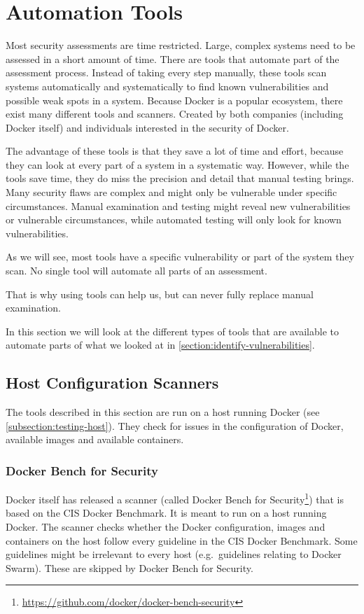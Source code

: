 \section{Automation Tools}\label{section:tools}
Most security assessments are time restricted. Large, complex systems need to be assessed in a short amount of time. There are tools that automate part of the assessment process. Instead of taking every step manually, these tools scan systems automatically and systematically to find known vulnerabilities and possible weak spots in a system. Because Docker is a popular ecosystem, there exist many different tools and scanners. Created by both companies (including Docker itself) and individuals interested in the security of Docker.

\medskip

The advantage of these tools is that they save a lot of time and effort, because they can look at every part of a system in a systematic way. However, while the tools save time, they do miss the precision and detail that manual testing brings. Many security flaws are complex and might only be vulnerable under specific circumstances. Manual examination and testing might reveal new vulnerabilities or vulnerable circumstances, while automated testing will only look for known vulnerabilities.

As we will see, most tools have a specific vulnerability or part of the system they scan. No single tool will automate all parts of an assessment.

That is why using tools can help us, but can never fully replace manual examination.

\medskip
In this section we will look at the different types of tools that are available to automate parts of what we looked at in \autoref{section:identify-vulnerabilities}.

\subsection{Host Configuration Scanners}
The tools described in this section are run on a host running Docker (see \autoref{subsection:testing-host}). They check for issues in the configuration of Docker, available images and available containers.

\subsubsection{Docker Bench for Security}\label{tools:bench}
Docker itself has released a scanner (called Docker Bench for Security\footnote{\url{https://github.com/docker/docker-bench-security}}) that is based on the CIS Docker Benchmark. It is meant to run on a host running Docker. The scanner checks whether the Docker configuration, images and containers on the host follow every guideline in the CIS Docker Benchmark. Some guidelines might be irrelevant to every host (e.g.\ guidelines relating to Docker Swarm). These are skipped by Docker Bench for Security.


